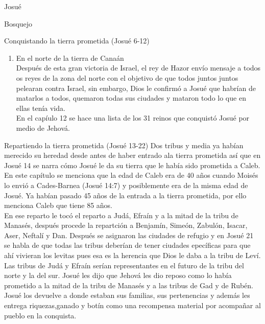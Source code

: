 \begin{section}{Josué}
\begin{subsection}{Bosquejo}
\begin{subsubsection}{Conquistando la tierra prometida (Josué 6-12)}
\begin{enumerate}
\begin{itemize}
Ese mismo día Josué fue con otros pueblos y también los derrotó. 
			\end{itemize}
		\item En el norte de la tierra de Canaán\\
			Después de esta gran victoria de Israel, el rey de Hazor envío mensaje a todos os reyes de la zona del norte con el objetivo de que todos juntos juntos pelearan contra Israel, sin embargo, Dios le confirmó a Josué que habrían de matarlos a todos, quemaron todas sus ciudades y mataron todo lo que en ellas tenía vida.\\
			En el capíulo 12 se hace una lista de los 31 reinos que conquistó Josué por medio de Jehová.

	\end{enumerate}
	\end{subsubsection}
	\begin{subsubsection}{Repartiendo la tierra prometida (Josué 13-22)}
		Dos tribus y media ya habían merecido su heredad desde antes de haber entrado ala tierra prometida así que en Josué 14 se narra cómo Josué le da su tierra que le había sido prometida a Caleb. En este capítulo se menciona que la edad de Caleb era de 40 años cuando Moisés lo envió a Cades-Barnea (Josué 14:7) y posiblemente era de la misma edad de Josué. Ya habían pasado 45 años de la entrada a la tierra prometida, por ello menciona Caleb que tiene 85 años.\\
		En ese reparto le tocó  el reparto a Judá, Efraín y a la mitad de la tribu de Manasés, después procede la repartción a Benjamín, Simeón, Zabulón, Isacar, Aser, Neftalí y Dan. Después se asignaron las ciudades de refugio y en Josué 21 se habla de que todas las tribus deberían de tener ciudades epecíficas para que ahí vivieran los levitas pues esa es la herencia que Dios le daba a la tribu de Leví. Las tribus de Judá y Efraín serían representantes en el futuro de la tribu del norte y la del sur.\newpage
		Josué les dijo  que Jehová les dio reposo como lo había prometido a la mitad de la tribu de Manasés y a las tribus de Gad y de Rubén. Josué los devuelve a donde estaban sus familias, sus pertenencias y además les entrega riquezas,ganado y botín como una recompensa material por acompañar al pueblo en la conquista.\\

\end{subsubsection}
\end{subsection}
\end{section}
